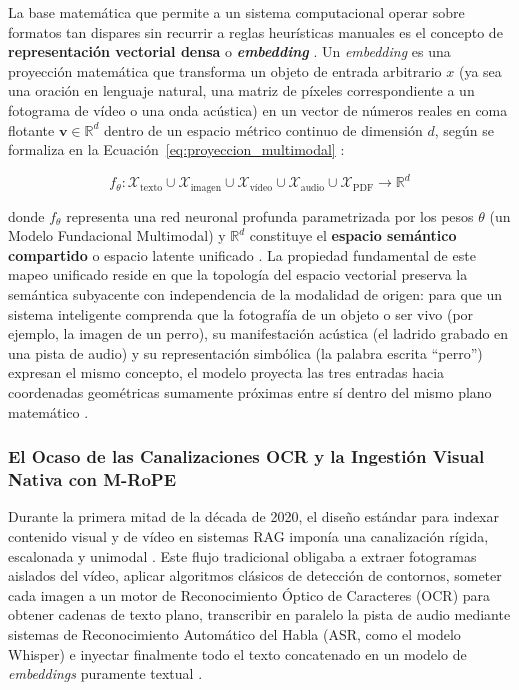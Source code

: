 La base matemática que permite a un sistema computacional operar sobre formatos tan dispares sin recurrir a reglas heurísticas manuales es el concepto de \textbf{representación vectorial densa} o \textbf{\textit{embedding}} \cite{gemini_emb2_docs}. Un \textit{embedding} es una proyección matemática que transforma un objeto de entrada arbitrario $x$ (ya sea una oración en lenguaje natural, una matriz de píxeles correspondiente a un fotograma de vídeo o una onda acústica) en un vector de números reales en coma flotante $\mathbf{v} \in \mathbb{R}^d$ dentro de un espacio métrico continuo de dimensión $d$, según se formaliza en la Ecuación~\eqref{eq:proyeccion_multimodal} \cite{gemini_emb2_docs}:

\begin{equation}
f_{\theta}: \mathcal{X}_{\text{texto}} \cup \mathcal{X}_{\text{imagen}} \cup \mathcal{X}_{\text{vídeo}} \cup \mathcal{X}_{\text{audio}} \cup \mathcal{X}_{\text{PDF}} \longrightarrow \mathbb{R}^d
\label{eq:proyeccion_multimodal}
\end{equation}

donde $f_{\theta}$ representa una red neuronal profunda parametrizada por los pesos $\theta$ (un Modelo Fundacional Multimodal) y $\mathbb{R}^d$ constituye el \textbf{espacio semántico compartido} o espacio latente unificado \cite{gemini_emb2_docs}. La propiedad fundamental de este mapeo unificado reside en que la topología del espacio vectorial preserva la semántica subyacente con independencia de la modalidad de origen: para que un sistema inteligente comprenda que la fotografía de un objeto o ser vivo (por ejemplo, la imagen de un perro), su manifestación acústica (el ladrido grabado en una pista de audio) y su representación simbólica (la palabra escrita ``perro'') expresan el mismo concepto, el modelo proyecta las tres entradas hacia coordenadas geométricas sumamente próximas entre sí dentro del mismo plano matemático \cite{gemini_emb2_docs}.

\subsubsection{El Ocaso de las Canalizaciones OCR y la Ingestión Visual Nativa con M-RoPE}
\label{subsubsec:ocaso_ocr_mrope}

Durante la primera mitad de la década de 2020, el diseño estándar para indexar contenido visual y de vídeo en sistemas RAG imponía una canalización rígida, escalonada y unimodal \cite{prajwal2025multimodal}. Este flujo tradicional obligaba a extraer fotogramas aislados del vídeo, aplicar algoritmos clásicos de detección de contornos, someter cada imagen a un motor de Reconocimiento Óptico de Caracteres (OCR) para obtener cadenas de texto plano, transcribir en paralelo la pista de audio mediante sistemas de Reconocimiento Automático del Habla (ASR, como el modelo Whisper) e inyectar finalmente todo el texto concatenado en un modelo de \textit{embeddings} puramente textual \cite{prajwal2025multimodal, video_rag2024}.


